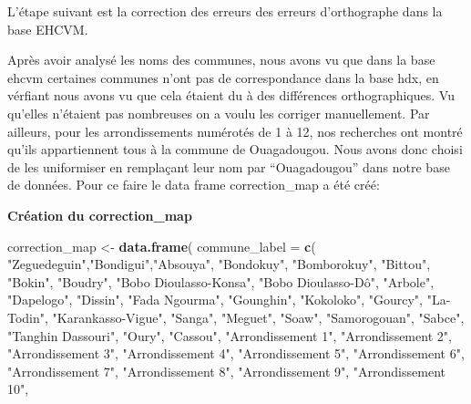 \documentclass[
]{article}
\newenvironment{Shaded}{\begin{snugshade}}{\end{snugshade}}
\newcommand{\AttributeTok}[1]{\textcolor[rgb]{0.13,0.29,0.53}{#1}}
\newcommand{\FunctionTok}[1]{\textcolor[rgb]{0.13,0.29,0.53}{\textbf{#1}}}
\newcommand{\NormalTok}[1]{#1}
\newcommand{\OtherTok}[1]{\textcolor[rgb]{0.56,0.35,0.01}{#1}}
\newcommand{\StringTok}[1]{\textcolor[rgb]{0.31,0.60,0.02}{#1}}
\begin{document}
L'étape suivant est la correction des erreurs des erreurs d'orthographe
dans la base EHCVM.

Après avoir analysé les noms des communes, nous avons vu que dans la
base ehcvm certaines communes n'ont pas de correspondance dans la base
hdx, en vérfiant nous avons vu que cela étaient du à des différences
orthographiques. Vu qu'elles n'étaient pas nombreuses on a voulu les
corriger manuellement. Par ailleurs, pour les arrondissements numérotés
de 1 à 12, nos recherches ont montré qu'ils appartiennent tous à la
commune de Ouagadougou. Nous avons donc choisi de les uniformiser en
remplaçant leur nom par ``Ouagadougou'' dans notre base de données. Pour
ce faire le data frame correction\_map a été créé:

\textbf{Création du correction\_map}

\begin{Shaded}
\begin{Highlighting}[]
\NormalTok{correction\_map }\OtherTok{\textless{}{-}} \FunctionTok{data.frame}\NormalTok{(}
  \AttributeTok{commune\_label =} \FunctionTok{c}\NormalTok{(}
    \StringTok{"Zeguedeguin"}\NormalTok{,}\StringTok{"Bondigui"}\NormalTok{,}\StringTok{"Absouya"}\NormalTok{, }\StringTok{"Bondokuy"}\NormalTok{, }
    \StringTok{"Bomborokuy"}\NormalTok{, }\StringTok{"Bittou"}\NormalTok{, }\StringTok{"Bokin"}\NormalTok{, }\StringTok{"Boudry"}\NormalTok{,}
    \StringTok{"Bobo Dioulasso{-}Konsa"}\NormalTok{, }\StringTok{"Bobo Dioulasso{-}Dô"}\NormalTok{, }\StringTok{"Arbole"}\NormalTok{, }
    \StringTok{"Dapelogo"}\NormalTok{, }\StringTok{"Dissin"}\NormalTok{, }\StringTok{"Fada N\textquotesingle{}gourma"}\NormalTok{, }\StringTok{"Gounghin"}\NormalTok{,}
    \StringTok{"Kokoloko"}\NormalTok{, }\StringTok{"Gourcy"}\NormalTok{, }\StringTok{"La{-}Todin"}\NormalTok{, }\StringTok{"Karankasso{-}Vigue"}\NormalTok{,}
    \StringTok{"Sanga"}\NormalTok{, }\StringTok{"Meguet"}\NormalTok{, }\StringTok{"Soaw"}\NormalTok{, }\StringTok{"Samorogouan"}\NormalTok{, }\StringTok{"Sabce"}\NormalTok{,}
    \StringTok{"Tanghin Dassouri"}\NormalTok{, }\StringTok{"Oury"}\NormalTok{, }\StringTok{"Cassou"}\NormalTok{,}
    \StringTok{"Arrondissement 1"}\NormalTok{, }\StringTok{"Arrondissement 2"}\NormalTok{,}
    \StringTok{"Arrondissement 3"}\NormalTok{, }\StringTok{"Arrondissement 4"}\NormalTok{,}
    \StringTok{"Arrondissement 5"}\NormalTok{, }\StringTok{"Arrondissement 6"}\NormalTok{,}
    \StringTok{"Arrondissement 7"}\NormalTok{, }\StringTok{"Arrondissement 8"}\NormalTok{,}
    \StringTok{"Arrondissement 9"}\NormalTok{, }\StringTok{"Arrondissement 10"}\NormalTok{,}

\end{Highlighting}
\end{Shaded}
\end{document}
